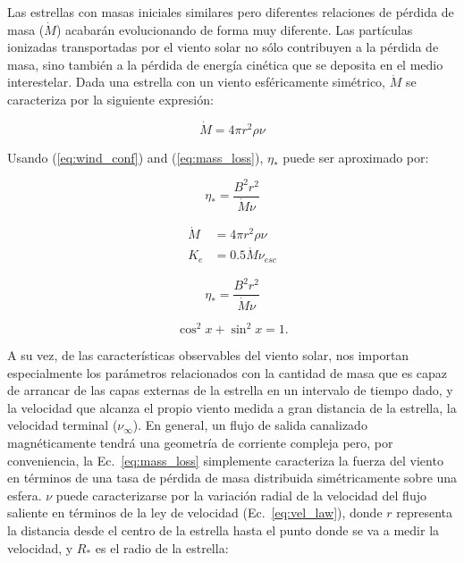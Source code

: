 Las estrellas con masas iniciales similares pero diferentes relaciones de pérdida de masa ($\Dot{M}$) acabarán evolucionando de forma muy diferente. Las partículas ionizadas transportadas por el viento solar no sólo contribuyen a la pérdida de masa, sino también a la pérdida de energía cinética que se deposita en el medio interestelar. Dada una estrella con un viento esféricamente simétrico, $\Dot{M}$ se caracteriza por la siguiente expresión:

\begin{ceqn}
\begin{equation}
    \Dot{M} = 4\pi r^2\rho\nu \label{eq:mass_loss}
\end{equation}
\end{ceqn}

Usando (\ref{eq:wind_conf}) and (\ref{eq:mass_loss}), $\eta_*$ puede ser aproximado por: 
\begin{ceqn}
\begin{equation}
    \eta_* = \frac{B^{2}r^{2}}{\Dot{M}\nu} \label{eq:wind_conf2}
\end{equation}
\end{ceqn}

\begin{ceqn}
\begin{align}
    \Dot{M} &= 4\pi r^2\rho\nu \label{eq:mass_loss}\\
    K_e &= 0.5\Dot{M}\nu_{esc}
\end{align}
\end{ceqn}


\begin{ceqn}
\begin{equation}
    \eta_* = \frac{B^{2}r^{2}}{\Dot{M}\nu} \label{eq:wind_conf2}
\end{equation}
\end{ceqn}

\begin{equation}\label{eq:identidad-pitagorica2}
  \cos^2 x + \sin^2 x = 1.
\end{equation}

A su vez, de las características observables del viento solar, nos importan especialmente los parámetros relacionados con la cantidad de masa que es capaz de arrancar de las capas externas de la estrella en un intervalo de tiempo dado, y la velocidad que alcanza el propio viento medida a gran distancia de la estrella, la velocidad terminal ($\nu_\infty$). En general, un flujo de salida canalizado magnéticamente tendrá una geometría de corriente compleja pero, por conveniencia, la Ec.~\ref{eq:mass_loss} simplemente caracteriza la fuerza del viento en términos de una tasa de pérdida de masa distribuida simétricamente sobre una esfera. $\nu$ puede caracterizarse por la variación radial de la velocidad del flujo saliente en términos de la ley de velocidad (Ec.~\ref{eq:vel_law}), donde $r$ representa la distancia desde el centro de la estrella hasta el punto donde se va a medir la velocidad, y $R_*$ es el radio de la estrella:\par

